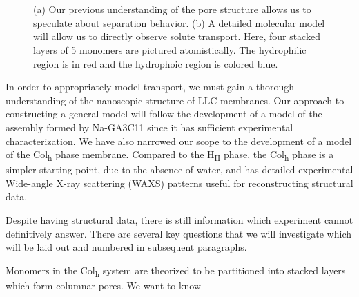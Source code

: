 \documentclass{article}
\begin{document}
\begin{figure}
\begin{subfigure}{0.45\linewidth}
		\caption{}~\label{fig:detailed_pore}
	\end{subfigure}
  \caption{(a) Our previous understanding of the pore structure allows us to speculate
	   about separation behavior. (b) A detailed molecular model will allow us to
	   directly observe solute transport. Here, four stacked layers of 5 monomers
           are pictured atomistically. The hydrophilic region is in red and the 
	   hydrophoic region is colored blue.}~\label{fig:detail}
  \end{figure}
 
  In order to appropriately model transport, we must gain a thorough
  understanding of the nanoscopic structure of LLC membranes.  Our approach to
  constructing a general model will follow the development of a model of the
  assembly formed by Na-GA3C11 since it has sufficient experimental
  characterization. We have also narrowed our scope to the development of a model
  of the Col\textsubscript{h} phase membrane. Compared to the H\textsubscript{II}
  phase, the Col\textsubscript{h} phase is a simpler starting point, due to the
  absence of water, and has detailed experimental Wide-angle X-ray scattering
  (WAXS) patterns useful for reconstructing structural data.  

  Despite having structural data, there is still information which experiment
  cannot definitively answer. There are several key questions that we will
  investigate which will be laid out and numbered in subsequent paragraphs.


  Monomers in the Col\textsubscript{h} system are theorized to be partitioned
  into stacked layers which form columnar pores. We want to know 
\end{document}
